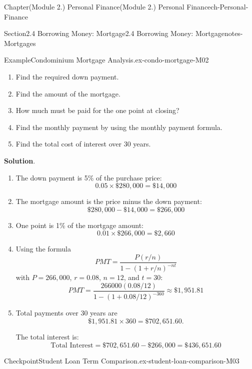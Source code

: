 \documentclass[oneside,10pt,]{book}
\newcommand{\blocktitlefont}{\relax}
\begin{document}
\begin{chapterptx}{Chapter}{(Module 2.) Personal Finance}{}{(Module 2.) Personal Finance}{}{}{ch-Personal-Finance}
\begin{sectionptx}{Section}{2.4 Borrowing Money: Mortgage}{}{2.4 Borrowing Money: Mortgage}{}{}{notes-Mortgages}
\begin{example}{Example}{Condominium Mortgage Analysis.}{ex-condo-mortgage-M02}
\begin{enumerate}
\item{}Find the required down payment.%
\item{}Find the amount of the mortgage.%
\item{}How much must be paid for the one point at closing?%
\item{}Find the monthly payment by using the monthly payment formula.%
\item{}Find the total cost of interest over 30 years.%
\end{enumerate}
\par\smallskip%
\noindent\textbf{\blocktitlefont Solution}.\hypertarget{ex-condo-mortgage-M02-3}{}\quad{}%
\begin{enumerate}
\item{}The down payment is 5\% of the purchase price:%
\begin{equation*}
0.05 \times \$280,000 = \$14,000
\end{equation*}
%
\item{}The mortgage amount is the price minus the down payment:%
\begin{equation*}
\$280,000 - \$14,000 = \$266,000
\end{equation*}
%
\item{}One point is 1\% of the mortgage amount:%
\begin{equation*}
0.01 \times \$266,000 = \$2,660
\end{equation*}
%
\item{}Using the formula%
\begin{equation*}
PMT = \frac{P(r/n)}{1-(1+r/n)^{-nt}}
\end{equation*}
with \(P = 266,000\), \(r = 0.08\), \(n = 12\), and \(t = 30\):%
\begin{equation*}
PMT = \frac{266000(0.08/12)}{1-(1+0.08/12)^{-360}} \approx \$1,951.81
\end{equation*}
%
\item{}Total payments over 30 years are%
\begin{equation*}
\$1,951.81 \times 360 = \$702,651.60\text{.}
\end{equation*}
%
\par
The total interest is:%
\begin{equation*}
\text{Total Interest} = \$702,651.60 - \$266,000 = \$436,651.60
\end{equation*}
%
\end{enumerate}
\end{example}
\begin{inlineexercise}{Checkpoint}{Student Loan Term Comparison.}{ex-student-loan-comparison-M03}%

\end{inlineexercise}
\end{sectionptx}
\end{chapterptx}
\end{document}
